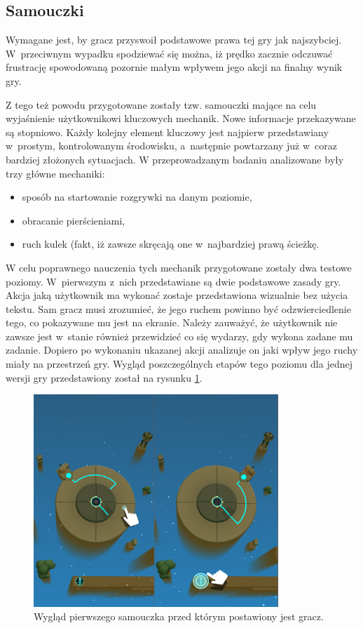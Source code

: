 \documentclass[a4paper,12pt,numbers=noenddot]{report}
\begin{document}
	\subsection{Samouczki}
Wymagane jest, by gracz przyswoił podstawowe prawa tej gry jak najszybciej. W~przeciwnym wypadku spodziewać się można, iż prędko zacznie odczuwać frustrację spowodowaną pozornie małym wpływem jego akcji na finalny wynik gry. 

Z tego też powodu przygotowane zostały tzw. samouczki mające na celu wyjaśnienie użytkownikowi kluczowych mechanik. Nowe informacje przekazywane są stopniowo. Każdy kolejny element kluczowy jest najpierw przedstawiany w~prostym, kontrolowanym środowisku, a~następnie powtarzany już w~coraz bardziej złożonych sytuacjach. 
W przeprowadzanym badaniu analizowane były trzy główne mechaniki: 
\begin{itemize}
\item sposób na startowanie rozgrywki na danym poziomie, 
\item obracanie pierścieniami,
\item ruch kulek (fakt, iż zawsze skręcają one w~najbardziej prawą ścieżkę.
\end{itemize}

W celu poprawnego nauczenia tych mechanik przygotowane zostały dwa testowe poziomy. W~pierwszym z~nich przedstawiane są dwie podstawowe zasady gry. Akcja jaką użytkownik ma wykonać zostaje przedstawiona wizualnie bez użycia tekstu. Sam gracz musi zrozumieć, że jego ruchem powinno być odzwierciedlenie tego, co pokazywane mu jest na ekranie. Należy zauważyć, że użytkownik nie zawsze jest w~stanie również przewidzieć co się wydarzy, gdy wykona zadane mu zadanie. Dopiero po wykonaniu ukazanej akcji analizuje on jaki wpływ jego ruchy miały na przestrzeń gry.
Wygląd poszczególnych etapów tego poziomu dla jednej wersji gry przedstawiony został na rysunku \ref{fig:tut_L1_1}.

\begin{figure}[h!]
	\centering
  	\includegraphics[height=8cm]{fig/tut1.jpg}
	\caption{Wygląd pierwszego samouczka przed którym postawiony jest gracz.}
	\label{fig:tut_L1_1}
\end{figure}
\end{document}
